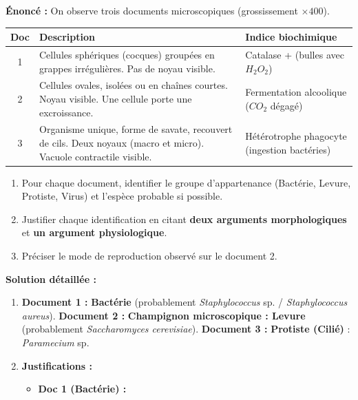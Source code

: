 \documentclass[11pt]{article}
\begin{document}
\begin{exoresolu}
    \textbf{Énoncé :} On observe trois documents microscopiques (grossissement $\times 400$).
    \begin{center}
        \begin{tabular}{|c|p{5cm}|p{5cm}|}\hline
        \textbf{Doc} & \textbf{Description} & \textbf{Indice biochimique} \\ \hline
        1 & Cellules sphériques (cocques) groupées en grappes irrégulières. Pas de noyau visible. & Catalase + (bulles avec $H_2O_2$) \\ \hline
        2 & Cellules ovales, isolées ou en chaînes courtes. Noyau visible. Une cellule porte une excroissance. & Fermentation alcoolique ($CO_2$ dégagé) \\ \hline
        3 & Organisme unique, forme de savate, recouvert de cils. Deux noyaux (macro et micro). Vacuole contractile visible. & Hétérotrophe phagocyte (ingestion bactéries) \\ \hline
        \end{tabular}
    \end{center}
    \begin{enumerate}
        \item Pour chaque document, identifier le groupe d'appartenance (Bactérie, Levure, Protiste, Virus) et l'espèce probable si possible.
        \item Justifier chaque identification en citant \textbf{deux arguments morphologiques} et \textbf{un argument physiologique}.
        \item Préciser le mode de reproduction observé sur le document 2.
    \end{enumerate}
    \tcblower
    \textbf{Solution détaillée :}
    \begin{enumerate}
        \item \textbf{Document 1 :} \textbf{Bactérie} (probablement \emph{Staphylococcus} sp. / \emph{Staphylococcus aureus}).
              \textbf{Document 2 :} \textbf{Champignon microscopique : Levure} (probablement \emph{Saccharomyces cerevisiae}).
              \textbf{Document 3 :} \textbf{Protiste (Cilié)} : \emph{Paramecium} sp.
        \item \textbf{Justifications :}
              \begin{itemize}
                  \item \textbf{Doc 1 (Bactérie) :}
                        \begin{itemize}

\end{itemize}
\end{itemize}
\end{enumerate}
\end{exoresolu}
\end{document}
